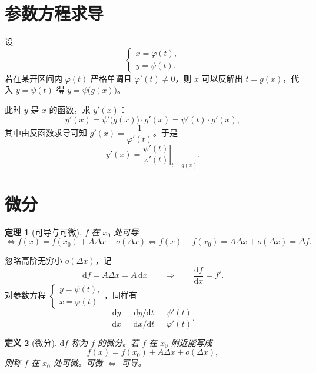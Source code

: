 \documentclass[UTF8,11pt]{ctexart}
\theoremstyle{cnthm}
\newtheorem{thm}{定理}[section]
\newtheorem{defn}[thm]{定义}
\begin{document}
\section{参数方程求导}

设
\[
\begin{cases}
x=\varphi(t),\\
y=\psi(t).
\end{cases}
\]
若在某开区间内 $\varphi(t)$ 严格单调且 $\varphi'(t)\neq0$，则 $x$ 可以反解出 $t=g(x)$，代入 $y=\psi(t)$ 得 $y=\psi\bigl(g(x)\bigr)$。

此时 $y$ 是 $x$ 的函数，求 $y'(x)$：
\[
y'(x)=\psi'\bigl(g(x)\bigr)\cdot g'(x)=\psi'(t)\cdot g'(x),
\]
其中由反函数求导可知 $g'(x)=\dfrac{1}{\varphi'(t)}$。于是
\[
y'(x)=\left.\frac{\psi'(t)}{\varphi'(t)}\right|_{t=g(x)} .
\]

\section{微分}

\begin{thm}[可导与可微]
$f$ 在 $x_0$ 处可导
\[
\iff f(x)=f(x_0)+A\Delta x+o(\Delta x)
\iff f(x)-f(x_0)=A\Delta x+o(\Delta x)=\Delta f .
\]
\end{thm}

忽略高阶无穷小 $o(\Delta x)$，记
\[
\mathrm{d}f=A\Delta x=A\,\mathrm{d}x
\qquad\Longrightarrow\qquad
\frac{\mathrm{d}f}{\mathrm{d}x}=f' .
\]
对参数方程 $\begin{cases}y=\psi(t),\\ x=\varphi(t)\end{cases}$，同样有
\[
\frac{\mathrm{d}y}{\mathrm{d}x}=\frac{\mathrm{d}y/\mathrm{d}t}{\mathrm{d}x/\mathrm{d}t}
=\frac{\psi'(t)}{\varphi'(t)} .
\]

\begin{defn}[微分]
$\mathrm{d}f$ 称为 $f$ 的微分。若 $f$ 在 $x_0$ 附近能写成
\[
f(x)=f(x_0)+A\Delta x+o(\Delta x),
\]
则称 $f$ 在 $x_0$ 处可微。可微 $\iff$ 可导。
\end{defn}
\end{document}
